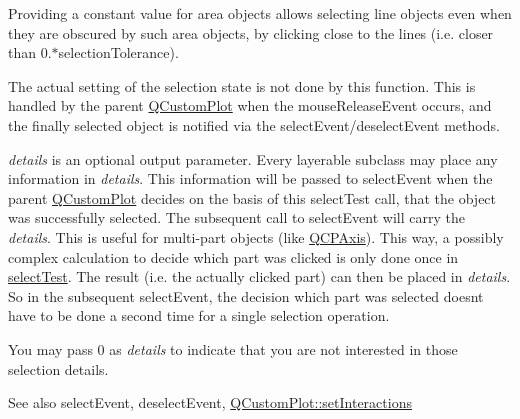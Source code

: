 Providing a constant value for area objects allows selecting line objects even when they are obscured by such area objects, by clicking close to the lines (i.\+e. closer than 0.$\ast$selection\+Tolerance).

The actual setting of the selection state is not done by this function. This is handled by the parent \hyperlink{class_q_custom_plot}{Q\+Custom\+Plot} when the mouse\+Release\+Event occurs, and the finally selected object is notified via the select\+Event/deselect\+Event methods.

{\itshape details} is an optional output parameter. Every layerable subclass may place any information in {\itshape details}. This information will be passed to select\+Event when the parent \hyperlink{class_q_custom_plot}{Q\+Custom\+Plot} decides on the basis of this select\+Test call, that the object was successfully selected. The subsequent call to select\+Event will carry the {\itshape details}. This is useful for multi-\/part objects (like \hyperlink{class_q_c_p_axis}{Q\+C\+P\+Axis}). This way, a possibly complex calculation to decide which part was clicked is only done once in \hyperlink{class_q_c_p_layerable_a4001c4d0dfec55598efa4d531f2179a9}{select\+Test}. The result (i.\+e. the actually clicked part) can then be placed in {\itshape details}. So in the subsequent select\+Event, the decision which part was selected doesn\textquotesingle{}t have to be done a second time for a single selection operation.

You may pass 0 as {\itshape details} to indicate that you are not interested in those selection details.

\begin{DoxySeeAlso}{See also}
select\+Event, deselect\+Event, \hyperlink{class_q_custom_plot_a5ee1e2f6ae27419deca53e75907c27e5}{Q\+Custom\+Plot\+::set\+Interactions} 
\end{DoxySeeAlso}


